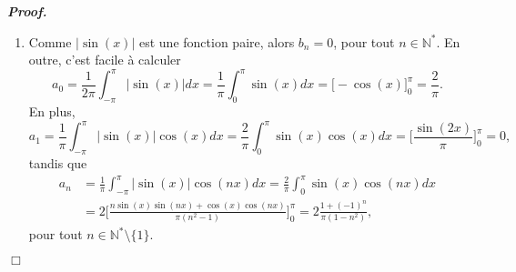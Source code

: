 \documentclass[11pt,a4paper]{article}
\newcommand{\NN}{\mathbb{N}}
\newenvironment{preuve}[1][]
{\vskip 2mm  \noindent\emph{\bf Proof#1. }}{$\Box$ \vskip 2mm}
\begin{document}
\begin{preuve}
\begin{enumerate}
			\item Comme $| \sin(x)|$ est une fonction paire, alors $b_{n} = 0$, pour tout $n \in \NN^{*}$. 
			En outre, c'est facile à calculer
			\[     a_{0} = \frac{1}{2\pi} \int_{-\pi}^{\pi} |\sin(x)| dx = \frac{1}{\pi} \int_{0}^{\pi} \sin(x) dx = \bigg[ - \cos(x) \bigg]_{0}^{\pi} = \frac{2}{\pi}.     \]
			En plus, 
			\[     a_{1} = \frac{1}{\pi} \int_{-\pi}^{\pi} |\sin(x)| \cos(x) dx = \frac{2}{\pi} \int_{0}^{\pi} \sin(x) \cos(x) dx 
			= \bigg[\frac{\sin(2 x)}{\pi} \bigg]_{0}^{\pi} = 0,     \]
			tandis que
			\begin{align*}
			a_{n} &= \frac{1}{\pi} \int_{-\pi}^{\pi} |\sin(x)| \cos(n x) dx = \frac{2}{\pi} \int_{0}^{\pi} \sin(x) \cos(n x) dx 
			\\
			&= 2 \bigg[\frac{n \sin(x) \sin(n x) + \cos(x) \cos(n x)}{\pi(n^{2}-1)} \bigg]_{0}^{\pi} 
			= 2 \frac{1+(-1)^{n}}{\pi(1-n^{2})},     
			\end{align*}
			pour tout $n \in \NN^{*} \setminus \{ 1 \}$.
			
		\end{enumerate} 
	\end{preuve}
	
\end{document}
